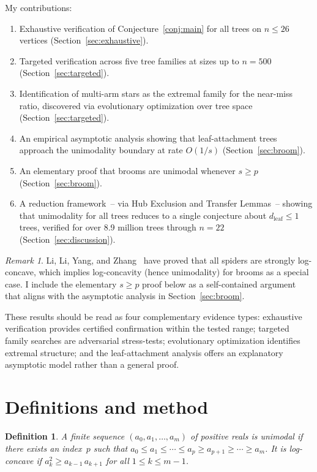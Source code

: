 \documentclass[12pt,oneside]{article}
\newtheorem{definition}{Definition}
\theoremstyle{remark}
\newtheorem{remark}{Remark}
\begin{document}
My contributions:
\begin{enumerate}
  \item Exhaustive verification of Conjecture~\ref{conj:main} for all trees on $n \le 26$ vertices (Section~\ref{sec:exhaustive}).
  \item Targeted verification across five tree families at sizes up to $n = 500$ (Section~\ref{sec:targeted}).
  \item Identification of multi-arm stars as the extremal family for the near-miss ratio, discovered via evolutionary optimization over tree space (Section~\ref{sec:targeted}).
  \item An empirical asymptotic analysis showing that leaf-attachment trees approach the unimodality boundary at rate $O(1/s)$ (Section~\ref{sec:broom}).
  \item An elementary proof that brooms are unimodal whenever $s \ge p$ (Section~\ref{sec:broom}).
  \item A reduction framework~-- via Hub Exclusion and Transfer Lemmas~-- showing that unimodality for all trees reduces to a single conjecture about $d_{\mathrm{leaf}} \le 1$ trees, verified for over 8.9 million trees through $n = 22$ (Section~\ref{sec:discussion}).
\end{enumerate}
\begin{remark}
  Li, Li, Yang, and Zhang~\citep{li2025spiders} have proved that all spiders are strongly log-concave, which implies log-concavity (hence unimodality) for brooms as a special case. I include the elementary $s \ge p$ proof below as a self-contained argument that aligns with the asymptotic analysis in Section~\ref{sec:broom}.
\end{remark}
These results should be read as four complementary evidence types: exhaustive verification provides certified confirmation within the tested range; targeted family searches are adversarial stress-tests; evolutionary optimization identifies extremal structure; and the leaf-attachment analysis offers an explanatory asymptotic model rather than a general proof.


\section{Definitions and method}\label{sec:method}

\begin{definition}
  A finite sequence $(a_0, a_1, \dotsc, a_m)$ of positive reals is \emph{unimodal} if there exists an index~$p$ such that $a_0 \le a_1 \le \dotsb \le a_p \ge a_{p+1} \ge \dotsb \ge a_m$.
  It is \emph{log-concave} if $a_k^2 \ge a_{k-1}\, a_{k+1}$ for all $1 \le k \le m-1$.
\end{definition}
\end{document}
